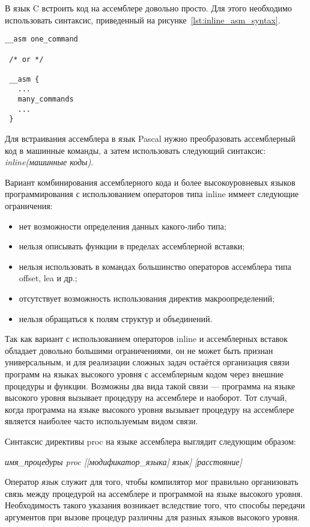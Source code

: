 \pagebreak

В язык C встроить код на ассемблере довольно просто. Для этого необходимо
использовать синтаксис, приведенный на рисунке~\ref{lst:inline_asm_syntax}.

\begin{lstlisting}[caption={Синтаксис встраимого ассемблерного кода в язык C},
label=lst:inline_asm_syntax]
 __asm one_command

 /* or */

 __asm {
   ...
   many_commands
   ...
 }
\end{lstlisting}

Для встраивания ассемблера в язык Pascal нужно преобразовать ассемблерный код
в машинные команды, а затем использовать следующий синтаксис:
\textit{inline(машинные коды)}.

Вариант комбинирования ассемблерного кода и более высокоуровневых языков
программирования с использованием операторов типа inline иммеет
следующие ограничения:
\begin{itemize}
  \item нет возможности определения данных какого-либо типа;
  \item нельзя описывать функции в пределах ассемблерной вставки;
  \item нельзя использовать в командах большинство операторов ассемблера типа offset, lea и др.;
  \item отсутствует возможность использования директив макроопределений;
  \item нельзя обращаться к полям структур и объединений.
\end{itemize}

Так как вариант с использованием операторов inline и ассемблерных вставок обладает
довольно большими ограничениями, он не может быть признан универсальным, и для
реализации сложных задач остаётся организация связи программ на языках высокого
уровня с ассемблерным кодом через внешние процедуры и функции. Возможны два
вида такой связи --- программа на языке высокого уровня вызывает процедуру на
ассемблере и наоборот. Тот случай, когда программа на языке высокого уровня
вызывает процедуру на ассемблере является наиболее часто используемым видом связи.

Синтаксис директивы proc на языке ассемблера выглядит следующим образом:

\textit{имя\_процедуры proc [[модификатор\_языка] язык] [расстояние]}

Оператор \textit{язык} служит для того, чтобы компилятор мог правильно организовать
связь между процедурой на ассемблере и программой на языке высокого
уровня. Необходимость такого указания возникает вследствие того, что способы передачи
аргументов при вызове процедур различны для разных языков высокого уровня.

